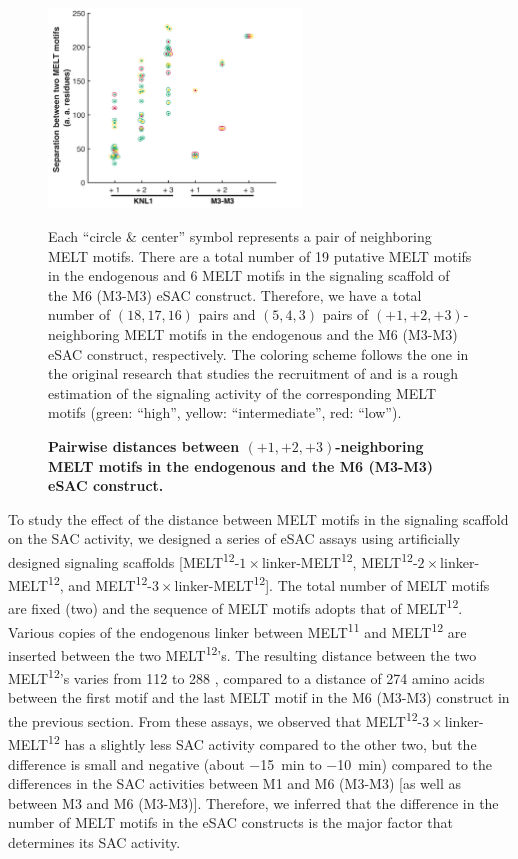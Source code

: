 \begin{figure}
    \centering
    \includegraphics[width=0.6\textwidth]{chapters/figures/MELTSeparationColorCodedBeeSwarmPlot.pdf}
    \caption{\textbf{Pairwise distances between $(+1, +2, +3)$-neighboring MELT motifs in the endogenous  and the M6 (M3-M3) eSAC construct.}}
    \noindent\justifying Each ``circle \& center'' symbol represents a pair of neighboring MELT motifs. There are a total number of 19 putative MELT motifs in the endogenous  and 6 MELT motifs in the signaling scaffold of the M6 (M3-M3) eSAC construct. Therefore, we have a total number of $(18, 17, 16)$ pairs and $(5, 4, 3)$ pairs of $(+1, +2, +3)$-neighboring MELT motifs in the endogenous  and the M6 (M3-M3) eSAC construct, respectively. The coloring scheme follows the one in the original research \cite{MELTactivity} that studies the recruitment of  and is a rough estimation of the signaling activity of the corresponding MELT motifs (green: ``high'', yellow: ``intermediate'', red: ``low'').
    \label{PairwiseDistancesBetweenNeighboringMELTs}
\end{figure}

To study the effect of the distance between MELT motifs in the signaling scaffold on the SAC activity, we designed a series of eSAC assays using artificially designed signaling scaffolds [MELT\textsuperscript{12}-$1\times$linker-MELT\textsuperscript{12}, MELT\textsuperscript{12}-$2\times$linker-MELT\textsuperscript{12}, and MELT\textsuperscript{12}-$3\times$linker-MELT\textsuperscript{12}]. The total number of MELT motifs are fixed (two) and the sequence of MELT motifs adopts that of MELT\textsuperscript{12}. Various copies of the endogenous linker between MELT\textsuperscript{11} and MELT\textsuperscript{12} are inserted between the two MELT\textsuperscript{12}'s. The resulting distance between the two MELT\textsuperscript{12}'s varies from 112 to 288 , compared to a distance of 274 amino acids between the first motif and the last MELT motif in the M6 (M3-M3) construct in the previous section. From these assays, we observed that MELT\textsuperscript{12}-$3\times$linker-MELT\textsuperscript{12} has a slightly less SAC activity compared to the other two, but the difference is small and negative (about \SI{-15}{min} to \SI{-10}{min}) compared to the differences in the SAC activities between M1 and M6 (M3-M3) [as well as between M3 and M6 (M3-M3)]. Therefore, we inferred that the difference in the number of MELT motifs in the eSAC constructs is the major factor that determines its SAC activity.

